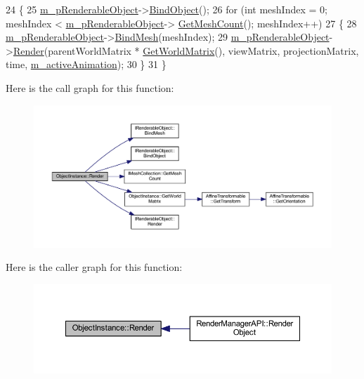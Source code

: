 \begin{DoxyCode}
24 \{
25   \hyperlink{class_object_instance_a67070bfa6058a31558b406be673df000}{m\_pRenderableObject}->\hyperlink{class_i_renderable_object_ab44c017819f2e57a9b4b4ba40961d9eb}{BindObject}();
26   \textcolor{keywordflow}{for} (\textcolor{keywordtype}{int} meshIndex = 0; meshIndex < \hyperlink{class_object_instance_a67070bfa6058a31558b406be673df000}{m\_pRenderableObject}->
      \hyperlink{class_i_mesh_collection_adf67edfc7e63ed993082714cfc9de7e2}{GetMeshCount}(); meshIndex++)
27   \{
28     \hyperlink{class_object_instance_a67070bfa6058a31558b406be673df000}{m\_pRenderableObject}->\hyperlink{class_i_renderable_object_ac0db472961e13dbbdc5cd36f14a87fae}{BindMesh}(meshIndex);
29     \hyperlink{class_object_instance_a67070bfa6058a31558b406be673df000}{m\_pRenderableObject}->\hyperlink{class_i_renderable_object_a6f47f692684ec70b5b776c0884495059}{Render}(parentWorldMatrix * 
      \hyperlink{class_object_instance_aa9a660435b76ef436a5dcdb24d897c4f}{GetWorldMatrix}(), viewMatrix, projectionMatrix, time, 
      \hyperlink{class_object_instance_afecd5e87b02f138d36e01b129e7edf68}{m\_activeAnimation});
30   \}
31 \}
\end{DoxyCode}


Here is the call graph for this function\+:\nopagebreak
\begin{figure}[H]
\begin{center}
\leavevmode
\includegraphics[width=350pt]{class_object_instance_a5aab17f4111ca91e123f9485c616aa6f_cgraph}
\end{center}
\end{figure}




Here is the caller graph for this function\+:
\nopagebreak
\begin{figure}[H]
\begin{center}
\leavevmode
\includegraphics[width=350pt]{class_object_instance_a5aab17f4111ca91e123f9485c616aa6f_icgraph}
\end{center}
\end{figure}


